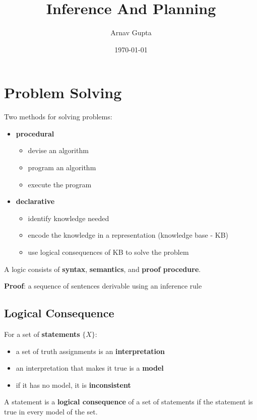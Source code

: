 \documentclass[11pt]{article}
\author{Arnav Gupta}
\date{\today}
\title{Inference And Planning}
\begin{document}
\maketitle
\tableofcontents

\section{Problem Solving}
\label{sec:org4f4d5d0}
Two methods for solving problems:
\begin{itemize}
\item \textbf{procedural}
\begin{itemize}
\item devise an algorithm
\item program an algorithm
\item execute the program
\end{itemize}
\item \textbf{declarative}
\begin{itemize}
\item identify knowledge needed
\item encode the knowledge in a representation (knowledge base - KB)
\item use logical consequences of KB to solve the problem
\end{itemize}
\end{itemize}

A logic consists of \textbf{syntax}, \textbf{semantics}, and \textbf{proof procedure}.

\textbf{Proof}: a sequence of sentences derivable using an inference rule
\subsection{Logical Consequence}
\label{sec:org5819281}
For a set of \textbf{statements} \(\{X\}\):
\begin{itemize}
\item a set of truth assignments is an \textbf{interpretation}
\item an interpretation that makes it true is a \textbf{model}
\item if it has no model, it is \textbf{inconsistent}
\end{itemize}

A statement is a \textbf{logical consequence} of a set of statements if the statement is true in every
model of the set.
\end{document}
